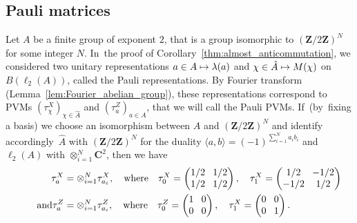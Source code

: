 \documentclass[10pt]{amsart}
\newcommand\mto{\mathchoice{\longmapsto}{\mapsto}{\mapsto}{\mapsto}}
\theoremstyle{plain}
\theoremstyle{definition}
\newcommand{\C}{\mathbf{C}}
\newcommand{\Z}{\mathbf{Z}}
\begin{document}
\subsection{Pauli matrices}\label{subsection:Pauli}
Let $A$ be a finite group of exponent $2$, that is a group isomorphic to $(\Z/2\Z)^N$ for some integer $N$. In~the proof of Corollary~\ref{thm:almost_anticommutation}, we considered two unitary representations $a \in A \mto \lambda(a)$ and $\chi \in \hat A \mto M(\chi)$ on $B(\ell_2(A))$, called the Pauli representations. By Fourier transform (Lemma~\ref{lem:Fourier_abelian_group}), these representations correspond to PVMs $(\tau^X_\chi)_{\chi \in \hat A}$ and $(\tau^Z_a)_{a \in A}$, that we will call the Pauli PVMs. If~(by~fixing a basis) we choose an isomorphism between $A$ and $(\Z/2\Z)^N$ and identify accordingly~$\hat A$ with $(\Z/2\Z)^N$ for the duality $\langle a ,b\rangle = (-1)^{\sum_{i=1}^N a_i b_i}$ and $\ell_2(A)$ with $\otimes_{i=1}^N \C^2$, then we have
\begin{align*}
\tau^X_a &= \otimes_{i=1}^N \tau^X_{a_i},\quad \text{where}\quad \arraycolsep4pt\tau^X_{0} = \begin{pmatrix} 1/2&1/2\\1/2&1/2
\end{pmatrix},\quad \tau^X_{1} = \begin{pmatrix} 1/2&-1/2\\-1/2&1/2
\end{pmatrix}\\
\tag*{and}
\tau^Z_a &= \otimes_{i=1}^N \tau^Z_{a_i},\quad \text{where}\quad \arraycolsep4pt\tau^Z_{0} = \begin{pmatrix} 1&0\\0&0
\end{pmatrix}, \quad \tau^X_{1} = \begin{pmatrix} 0&0\\0&1
\end{pmatrix}.
\end{align*}
\end{document}
